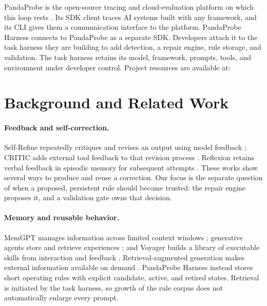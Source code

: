 \documentclass[11pt,letterpaper]{article}
\begin{document}
PandaProbe is the open-source tracing and cloud-evaluation platform on
which this loop rests \citep{tayebati2026pandaprobe}. Its SDK client traces
AI systems built with any framework, and its CLI gives them a communication
interface to the platform. PandaProbe Harness connects to PandaProbe
as a separate SDK. Developers attach it to the task harness they
are building to add detection, a repair engine, rule storage, and
validation. The task harness retains its model, framework, prompts, tools,
and environment under developer control. Project resources are available at:
\par\smallskip
{}

\section{Background and Related Work}
\label{sec:related}

\paragraph{Feedback and self-correction.}
Self-Refine repeatedly critiques and revises an output using model feedback
\citep{madaan2023selfrefine}; CRITIC adds external tool feedback to that
revision process \citep{gou2024critic}. Reflexion retains verbal feedback in
episodic memory for subsequent attempts \citep{shinn2023reflexion}. These
works show several ways to produce and reuse a correction. Our focus is the
separate question of when a proposed, persistent rule should become trusted:
the repair engine proposes it, and a validation gate owns that decision.

\paragraph{Memory and reusable behavior.}
MemGPT manages information across limited context windows
\citep{packer2023memgpt}; generative agents store and retrieve experiences
\citep{park2023generative}; and Voyager builds a library of executable skills
from interaction and feedback \citep{wang2023voyager}. Retrieval-augmented
generation makes external information available on demand
\citep{lewis2020rag}. PandaProbe Harness instead stores short operating rules
with explicit candidate, active, and retired states. Retrieval is initiated by
the task harness, so growth of the rule corpus does not automatically enlarge
every prompt.
\end{document}
